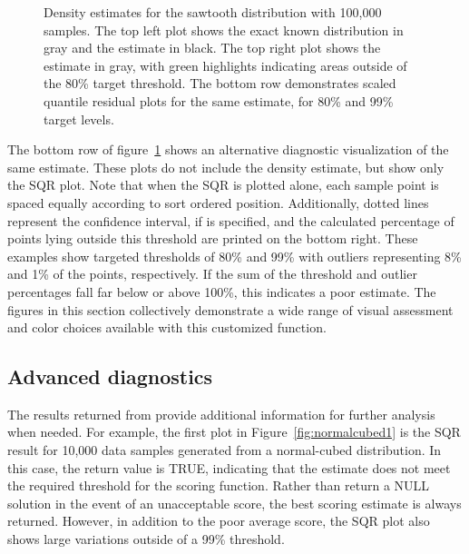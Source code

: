 \begin{figure}[tbp]
\begin{tabular}{p{}p{}}
\end{tabular}
\caption{\label{fig:example2} Density estimates for the sawtooth distribution with 100,000 samples.  The top left plot shows the exact known distribution in gray and the estimate in black.  The top right plot shows the estimate in gray, with green highlights indicating areas outside of the 80\% target threshold. The bottom row demonstrates scaled quantile residual plots for the same estimate, for 80\% and 99\% target levels.}
\end{figure}

The bottom row of figure~\ref{fig:example2} shows an alternative diagnostic visualization of the same estimate.  These plots do not include the density estimate, but show only the SQR plot. Note that when the SQR is plotted alone, each sample point is spaced equally according to sort ordered position.  Additionally, dotted lines represent the confidence interval, if  is specified, and the calculated percentage of points lying outside this threshold are printed on the bottom right.  These examples show targeted  thresholds of 80\% and 99\% with outliers representing 8\%  and 1\% of the points, respectively.  If the sum of the threshold and outlier percentages fall far below or above 100\%, this indicates a poor estimate. The figures in this section collectively demonstrate a wide range of visual assessment and color choices available with this customized  function.



\subsection{Advanced diagnostics} \label{diagnostics}

The results returned from  provide additional information for further analysis when needed. For example, the first plot in Figure~\ref{fig:normalcubed1} is the SQR result for 10,000 data samples generated from a normal-cubed distribution. In this case, the  return value is TRUE, indicating that the estimate does not meet the required threshold for the scoring function. Rather than return a NULL solution in the event of an unacceptable score, the best scoring estimate is always returned. However, in addition to the poor average score, the SQR plot also shows large variations outside of a 99\% threshold.

